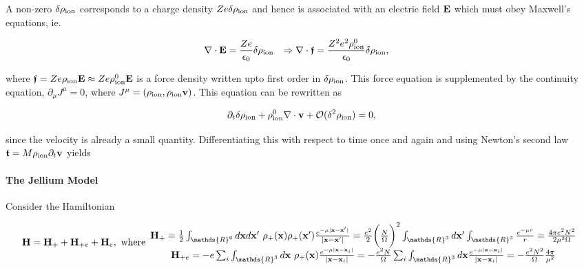 \documentclass{homework}
\begin{document}
A non-zero $\delta \rho_{\textnormal{ion}}$ corresponds to a charge density $Z e \delta \rho_{\textnormal{ion}}$ and hence is associated with an electric field ${\bf E}$ which must obey Maxwell's equations, ie.

\begin{align}
    \nabla \cdot {\bf E} &= \frac{Ze}{\epsilon_0} \delta \rho_{\textnormal{ion}} & \Rightarrow  \nabla \cdot \bm{\mathfrak{f}} &= \frac{Z^2 e^2 \rho^0_{\textnormal{ion}} }{\epsilon_0} \delta \rho_{\textnormal{ion}},
\end{align}

where $\bm{\mathfrak{f}} = Z e \rho_{\textnormal{ion}} {\bf E} \approx Z e \rho^0_{\textnormal{ion}} {\bf E}$ is a force density written upto first order in $\delta \rho_{\textnormal{ion}}$. This force equation is supplemented by the continuity equation, $\partial_{\mu} J^\mu = 0$, where $J^\mu = (\rho_{\textnormal{ion}}, \rho_{\textnormal{ion}} {\bf v})$. This equation can be rewritten as 

$$
\partial_t \delta \rho_{\textnormal{ion}} +  \rho^0_{\textnormal{ion}} \nabla \cdot {\bf v} + \mathcal{O}(\delta^2 \rho_{\textnormal{ion}}) = 0,
$$

since the velocity is already a small quantity. Differentiating this with respect to time once and again and using Newton's second law $\bm{\mathfrak{t}} = M \rho_{\textnormal{ion}} \partial_t {\bf v}$ yields 
\fi

\paragraph{\textbf{The Jellium Model}}


Consider the Hamiltonian 

\begin{equation}
    {\bf H}= {\bf H}_{+} + {\bf H}_{+e} + {\bf H}_{e}, \textnormal{ where}
    \begin{array}{c}
         {\bf H}_+ = \frac{1}{2} \int_{\mathds{R}^6} d{\bf x} d{\bf x}' \blanky \rho_{+}({\bf x}) \rho_{+}({\bf x}') \frac{e^{-\mu |{\bf x}-{\bf x}'|}}{|{\bf x} - {\bf x}'|} = \frac{e^2}{2} \bigg(\frac{N}{\Omega}\bigg)^2 \int_{\mathds{R}^3} d{\bf x}' \int_{\mathds{R}^3} \frac{e^{-{\mu} r}}{r} = \frac{4\pi e^2 N^2}{2\mu^2\Omega}\\
         {\bf H}_{+e} = - e\sum_{i} \int_{\mathds{R}^3} d{\bf x} \blanky \rho_{+}({\bf x}) \frac{e^{-\mu |{\bf x}-{\bf x}_i|}}{|{\bf x}-{\bf x}_i|} = -\frac{e^2 N}{\Omega} \sum_{i} \int_{\mathds{R}^3} d{\bf x} \frac{e^{-\mu |{\bf x}-{\bf x}_i|}}{|{\bf x}-{\bf x}_i|} = - \frac{e^2 N^2}{\Omega} \frac{4\pi}{\mu^2}
    \end{array}
\end{equation}
\end{document}
